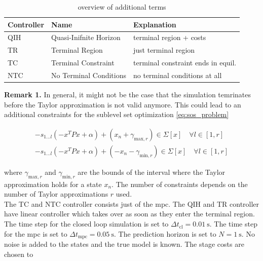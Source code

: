 \documentclass[10pt,a4paper]{article}
\begin{document}
\renewcommand{\arraystretch}{1.25}
\begin{table}[ht]
    \centering
    \captionsetup{skip=0.25cm}
    \caption{overview of additional terms}
    \label{tbl:controler}
    \begin{tabular}{|p{2cm}|p{3.75cm}|p{5.75cm}|}
        \hline
        \textbf{Controller} & \textbf{Name} &  \textbf{Explanation}\\
        \hline
        QIH & Quasi-Inifnite Horizon & terminal region + costs\\
        \hline
        TR & Terminal Region & just terminal region\\
        \hline
        TC & Terminal Constraint & terminal constraint ends in equil.\\
        \hline
        NTC & No Terminal Conditions & no terminal conditions at all\\
        \hline
    \end{tabular}
\end{table}

\textbf{Remark 1.} In general, it might not be the case that the simulation temrinates before the Taylor approximation is not valid anymore.
This could lead to an additional constraints for the sublevel set optimization \eqref{eq:sos_problem}

\begin{align}
	-s_{1 \dots l}(-x^TPx + \alpha) + (x_{n} + \gamma_{\text{max},r}) \in \Sigma[x] \quad \forall l \in [1,r] \\
	-s_{1 \dots l}(-x^TPx + \alpha) + (-x_{n} - \gamma_{\text{min},r}) \in \Sigma[x] \quad \forall l \in [1,r]
\end{align}

where $\gamma_{\text{max},r}$ and $\gamma_{\text{min},r}$ are the bounds of the interval where the Taylor approximation holds for a state $x_n$.
The number of constraints depends on the number of Taylor approximations $r$ used.\\

The TC and NTC controller consists just of the \gls{mpc}. The QIH and TR controller have linear controller which takes over as soon as they enter the terminal region.
The time step for the closed loop simulation is set to $\Delta t_{\text{cl}} = \SI{0.01}{\second}$.  The time step for the \gls{mpc} is set to
$\Delta t_{\text{mpc}} = \SI{0.05}{\second}$. The prediction horizon is set to $N = \SI{1}{\second}$. No noise is added to the states and the true
model is known. The stage costs are chosen to
\end{document}
